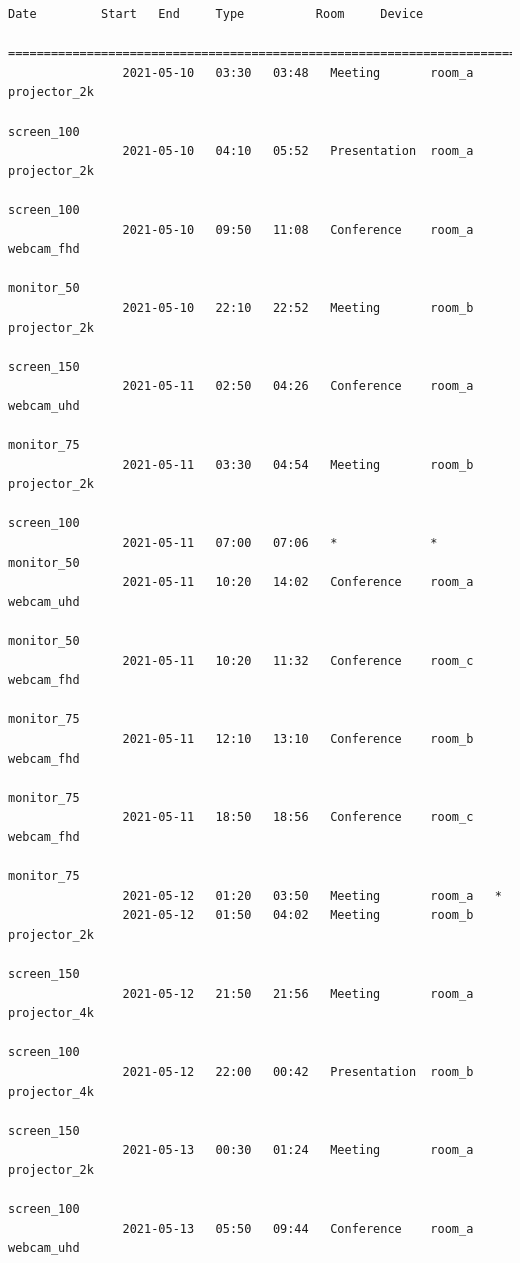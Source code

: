 \documentclass{article}
\begin{document}
\begin{Verbatim}[gobble=8]
                Date         Start   End     Type          Room     Device
                ===========================================================================
                2021-05-10   03:30   03:48   Meeting       room_a   projector_2k
                                                                    screen_100
                2021-05-10   04:10   05:52   Presentation  room_a   projector_2k
                                                                    screen_100
                2021-05-10   09:50   11:08   Conference    room_a   webcam_fhd
                                                                    monitor_50
                2021-05-10   22:10   22:52   Meeting       room_b   projector_2k
                                                                    screen_150
                2021-05-11   02:50   04:26   Conference    room_a   webcam_uhd
                                                                    monitor_75
                2021-05-11   03:30   04:54   Meeting       room_b   projector_2k
                                                                    screen_100
                2021-05-11   07:00   07:06   *             *        monitor_50
                2021-05-11   10:20   14:02   Conference    room_a   webcam_uhd
                                                                    monitor_50
                2021-05-11   10:20   11:32   Conference    room_c   webcam_fhd
                                                                    monitor_75
                2021-05-11   12:10   13:10   Conference    room_b   webcam_fhd
                                                                    monitor_75
                2021-05-11   18:50   18:56   Conference    room_c   webcam_fhd
                                                                    monitor_75
                2021-05-12   01:20   03:50   Meeting       room_a   *
                2021-05-12   01:50   04:02   Meeting       room_b   projector_2k
                                                                    screen_150
                2021-05-12   21:50   21:56   Meeting       room_a   projector_4k
                                                                    screen_100
                2021-05-12   22:00   00:42   Presentation  room_b   projector_4k
                                                                    screen_150
                2021-05-13   00:30   01:24   Meeting       room_a   projector_2k
                                                                    screen_100
                2021-05-13   05:50   09:44   Conference    room_a   webcam_uhd

\end{Verbatim}
\end{document}
